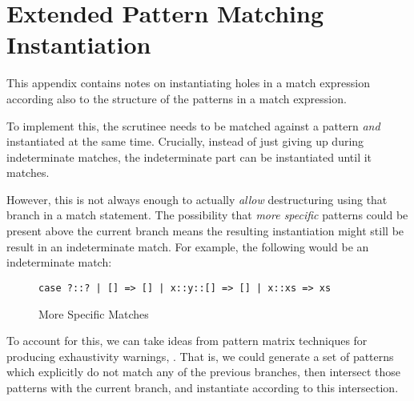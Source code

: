 \chapter{Extended Pattern Matching Instantiation}
\label{sec:extendedmatching}
This appendix contains notes on instantiating holes in a match expression according also to the structure of the patterns in a match expression.

To implement this, the scrutinee needs to be matched against a pattern \textit{and} instantiated at the same time. Crucially, instead of just giving up during indeterminate matches, the indeterminate part can be instantiated until it matches.

However, this is not always enough to actually \textit{allow} destructuring using that branch in a match statement. The possibility that \textit{more specific} patterns could be present above the current branch means the resulting instantiation might still be result in an indeterminate match. For example, the following would be an indeterminate match:

\begin{figure}[H]
\texttt{case ?::? | [] => [] | x::y::[] => [] | x::xs => xs}

\caption{More Specific Matches}
\end{figure}

To account for this, we can take ideas from pattern matrix techniques for producing exhaustivity warnings, \cite{PatternMatchingWarnings}. That is, we could generate a set of patterns which explicitly do not match any of the previous branches, then intersect those patterns with the current branch, and instantiate according to this intersection.